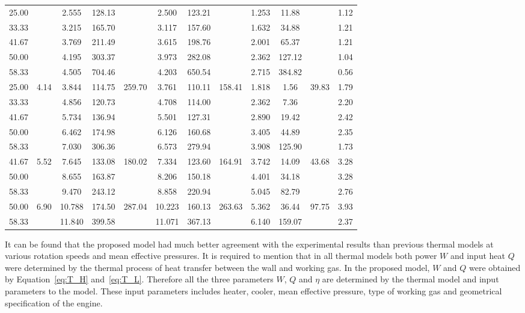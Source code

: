 \documentclass[preprint,5p, twocolumn]{elsarticle}
\begin{document}
\begin{table}[htbp]
\begin{center}
\begin{tabular}{cccccccccccc}
		25.00	&&2.555	&128.13	&&2.500	&123.21	&&1.253	&11.88	&&1.12\\
		33.33	&&3.215	&165.70	&&3.117	&157.60	&&1.632	&34.88	&&1.21\\
		41.67	&&3.769	&211.49	&&3.615	&198.76	&&2.001	&65.37	&&1.21\\
		50.00	&&4.195	&303.37	&&3.973	&282.08	&&2.362	&127.12	&&1.04\\
		58.33	&&4.505	&704.46	&&4.203	&650.54	&&2.715	&384.82	&&0.56\\
		\midrule
		25.00	&\multirow{5}{*}{4.14}	&3.844	&114.75	&\multirow{5}{*}{259.70}	&3.761	&110.11	&\multirow{5}{*}{158.41}	&1.818	&1.56	&\multirow{5}{*}{39.83}	&1.79\\
		33.33	&&4.856	&120.73	&&4.708	&114.00	&&2.362	&7.36	&&2.20\\
		41.67	&&5.734	&136.94	&&5.501	&127.31	&&2.890	&19.42	&&2.42\\
		50.00	&&6.462	&174.98	&&6.126	&160.68	&&3.405	&44.89	&&2.35\\
		58.33	&&7.030	&306.36	&&6.573	&279.94	&&3.908	&125.90	&&1.73\\
		\midrule
		41.67	&\multirow{3}{*}{5.52}	&7.645	&133.08	&\multirow{3}{*}{180.02}	&7.334	&123.60	&\multirow{3}{*}{164.91}	&3.742	&14.09	&\multirow{3}{*}{43.68}	&3.28\\
		50.00	&&8.655	&163.87	&&8.206	&150.18	&&4.401	&34.18	&&3.28\\
		58.33	&&9.470	&243.12	&&8.858	&220.94	&&5.045	&82.79	&&2.76\\
		\midrule
		50.00	&\multirow{2}{*}{6.90}	&10.788	&174.50	&\multirow{2}{*}{287.04}	&10.223	&160.13	&\multirow{2}{*}{263.63}	&5.362	&36.44	&\multirow{2}{*}{97.75}		&3.93\\
		58.33	&&11.840	&399.58	&&11.071	&367.13	&&6.140	&159.07	&&2.37\\
		\bottomrule
	\end{tabular}
	\end{center}
	\label{tab:PowerComparison}
\end{table}

It can be found that the proposed model had much better agreement with the experimental results than previous thermal models at various rotation speeds and mean effective pressures. It is required to mention that in all thermal models both power $W$ and input heat $Q$ were determined by the thermal process of heat transfer between the wall and working gas. In the proposed model, $W$ and $Q$ were obtained by Equation~\ref{eq:T_H} and~\ref{eq:T_L}. Therefore all the three parameters $W$, $Q$ and $\eta$ are determined by the thermal model and input parameters to the model. These input parameters includes heater, cooler, mean effective pressure, type of working gas and geometrical specification of the engine.
\end{document}

